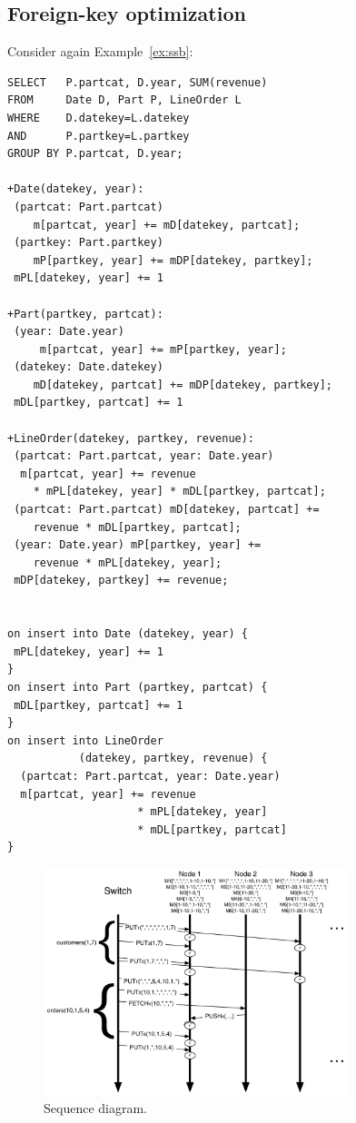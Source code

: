 \subsection{Foreign-key optimization}


\begin{example}
Consider again Example~\ref{ex:ssb}:
\begin{verbatim}
SELECT   P.partcat, D.year, SUM(revenue)
FROM     Date D, Part P, LineOrder L
WHERE    D.datekey=L.datekey
AND      P.partkey=L.partkey
GROUP BY P.partcat, D.year;

+Date(datekey, year):
 (partcat: Part.partcat)
    m[partcat, year] += mD[datekey, partcat];
 (partkey: Part.partkey)
    mP[partkey, year] += mDP[datekey, partkey];
 mPL[datekey, year] += 1

+Part(partkey, partcat):
 (year: Date.year)
     m[partcat, year] += mP[partkey, year];
 (datekey: Date.datekey)
    mD[datekey, partcat] += mDP[datekey, partkey];
 mDL[partkey, partcat] += 1

+LineOrder(datekey, partkey, revenue):
 (partcat: Part.partcat, year: Date.year)
  m[partcat, year] += revenue
    * mPL[datekey, year] * mDL[partkey, partcat];
 (partcat: Part.partcat) mD[datekey, partcat] +=
    revenue * mDL[partkey, partcat];
 (year: Date.year) mP[partkey, year] +=
    revenue * mPL[datekey, year];
 mDP[datekey, partkey] += revenue;


on insert into Date (datekey, year) {
 mPL[datekey, year] += 1
}
on insert into Part (partkey, partcat) {
 mDL[partkey, partcat] += 1
}
on insert into LineOrder
           (datekey, partkey, revenue) {
  (partcat: Part.partcat, year: Date.year)
  m[partcat, year] += revenue
                    * mPL[datekey, year]
                    * mDL[partkey, partcat]
}
\end{verbatim}
\end{example}




\begin{figure}
\begin{center}
\includegraphics[width=3.5in]{images/MessageFlow.pdf}
\caption{Sequence diagram.}
\end{center}
\end{figure}



